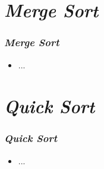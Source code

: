 \documentclass[aspectratio=169]{beamer}
\begin{document}
\section{\emph{Merge Sort}}

\begin{frame}\frametitle{\emph{Merge Sort}}
\begin{itemize}
	\item ...
\end{itemize}
%
\end{frame}

\section{\emph{Quick Sort}}

\begin{frame}\frametitle{\emph{Quick Sort}}
\begin{itemize}
	\item ...
\end{itemize}
%	
\end{frame}
\end{document}

